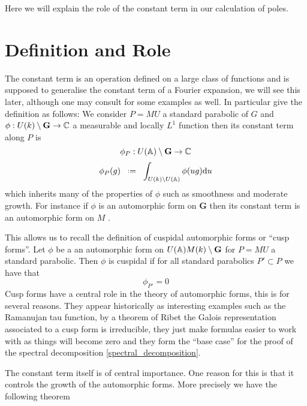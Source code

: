 Here we will explain the role of the constant term in our calculation of poles.\label{constant_terms}

\section{Definition and Role} \label{cuspidal_form_definition}
The constant term is an operation defined on a large class of functions and is supposed to generalise the constant term of a Fourier expansion, we will see this later, although one may consult \cite[1.6]{bumpAutomorphicFormsRepresentations1997} for some examples as well. In particular \cite[I.2.6]{moeglinSpectralDecompositionEisenstein1995} give the definition as follows: We consider \(P=MU\) a standard parabolic of \(G\) and \(\phi: U(k)\setminus \mathbf{G} \to \C\) a measurable and locally \(L^1\) function then its constant term along \(P\) is 
\[\phi_P :  U(\A)\setminus \mathbf{G} \to \C\]
\[\phi_P(g) \defeq \int_{U(k)\setminus U(\A)}\phi(ug) \mathrm{d}u\]
which inherits many of the properties of \(\phi\) such as smoothness and moderate growth. For instance if \(\phi\) is an automorphic form on \(\mathbf{G}\) then its constant term is an automorphic form on \(M\) \cite[6.5]{getzIntroductionAutomorphicRepresentations2024}.

This allows us to recall the definition of cuspidal automorphic forms or ``cusp forms''. Let \(\phi\) be a an automorphic form on \(U(\A)M(k)\setminus \mathbf{G}\) for \(P = MU\) a standard parabolic. Then \(\phi\) is cuspidal if for all standard parabolics \(P'\subset P\) we have that 
\[\phi_{P'} = 0\]
Cusp forms have a central role in the theory of automorphic forms, this is for several reasons. They appear historically as interesting examples such as the Ramanujan tau function, by a theorem of Ribet \cite[T2.3]{serreProceedingsInternationalConference1977} the Galois representation associated to a cusp form is irreducible, they just make formulas easier to work with as things will become zero and they form the ``base case'' for the proof of the spectral decomposition \ref{spectral_decomposition}.

The constant term itself is of central importance. One reason for this is that it controls the growth of the automorphic forms. More precisely we have the following theorem \cite[I.4.10]{moeglinSpectralDecompositionEisenstein1995}

